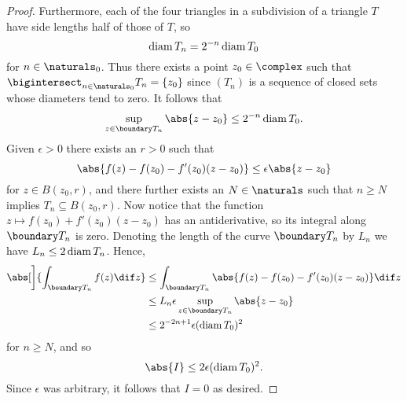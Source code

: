 \documentclass[article, a4paper, 11pt, oneside]{memoir}
\numberwithin{equation}{chapter}
\begin{document}
\begin{proof}
    Furthermore, each of the four triangles in a subdivision of a triangle $T$ have side lengths half of those of $T$, so
    \begin{equation*}
        \operatorname{diam} T_n
            = 2^{-n} \operatorname{diam} T_0
    \end{equation*}
    for $n \in \naturals_0$. Thus there exists a point $z_0 \in \complex$ such that $\bigintersect_{n\in\naturals_0} T_n = \{ z_0 \}$ since $(T_n)$ is a sequence of closed sets whose diameters tend to zero. It follows that
    \begin{equation*}
        \sup_{z \in \boundary T_n} \abs{z - z_0}
            \leq 2^{-n} \diam T_0.
    \end{equation*}
    Given $\epsilon > 0$ there exists an $r > 0$ such that
    \begin{equation*}
        \abs{ f(z) - f(z_0) - f'(z_0)(z - z_0) }
            \leq \epsilon \abs{z - z_0}
    \end{equation*}
    for $z \in B(z_0,r)$, and there further exists an $N \in \naturals$ such that $n \geq N$ implies $T_n \subseteq B(z_0,r)$. Now notice that the function $z \mapsto f(z_0) + f'(z_0)(z - z_0)$ has an antiderivative, so its integral along $\boundary T_n$ is zero. Denoting the length of the curve $\boundary T_n$ by $L_n$ we have $L_n \leq 2 \operatorname{diam} T_n$. Hence,
    \begin{align*}
        \abs[\bigg]{ \int_{\boundary T_n} f(z) \dif z }
            &\leq \int_{\boundary T_n} \abs{ f(z) - f(z_0) - f'(z_0)(z - z_0) } \dif z \\
            &\leq L_n \epsilon \sup_{z \in \boundary T_n} \abs{z - z_0} \\
            &\leq 2^{-2n+1} \epsilon (\diam T_0)^2
    \end{align*}
    for $n \geq N$, and so
    \begin{equation*}
        \abs{I}
            \leq 2 \epsilon (\diam T_0)^2.
    \end{equation*}
    Since $\epsilon$ was arbitrary, it follows that $I = 0$ as desired.
\end{proof}


\nocite{*}

\printbibliography
\end{document}
